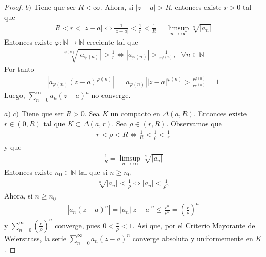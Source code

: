 \begin{proof}
    $b)$ Tiene que ser $R < \infty$. Ahora, si $|z-a| > R$, entonces existe $r > 0$ tal que
    \begin{align*}
        R < r < |z-a| \Longleftrightarrow \frac{1}{|z-a|} < \frac{1}{r} < \frac{1}{R} = \limsup_{n \to \infty}{\sqrt[n]{|a_n|}}
    \end{align*}
    Entonces existe $\varphi : \mathbb{N} \longrightarrow \mathbb{N}$ creciente tal que
    \begin{align*}
        \sqrt[\varphi(n)]{\left|a_{\varphi(n)}\right|} > \frac{1}{r} \Longleftrightarrow \left|a_{\varphi(n)}\right| > \frac{1}{r^{\varphi(n)}}, \ \ \ \forall n \in \mathbb{N}
    \end{align*}
    Por tanto
    \begin{align*}
        \left| a_{\varphi(n)}(z-a)^{\varphi(n)} \right| = \left| a_{\varphi(n)}\right|\left| z-a \right|^{\varphi(n)} > \frac{r^{\varphi(n)}}{r^{\varphi(n)}} = 1
    \end{align*}
    Luego, $\sum_{n=0}^{\infty}{a_n(z-a)^n}$ no converge.

    $a)$  $c)$ Tiene que ser $R > 0$. Sea $K$ un compacto en $\Delta(a,R)$. Entonces existe $r \in (0,R)$ tal que $K \subset \Delta(a,r)$. Sea $\rho \in (r,R)$. Observamos que
    \begin{align*}
        r < \rho < R \Longleftrightarrow \frac{1}{R} < \frac{1}{\rho} < \frac{1}{r}
    \end{align*}
    y que
    \begin{align*}
        \frac{1}{R} = \limsup_{n \to \infty}{\sqrt[n]{|a_n|}}
    \end{align*}
    Entonces existe $n_0 \in \mathbb{N}$ tal que si $n \ge n_0$
    \begin{align*}
        \sqrt[n]{|a_n|} < \frac{1}{\rho} \Longleftrightarrow |a_n| < \frac{1}{\rho^n}
    \end{align*}
    Ahora, si $n \ge n_0$
    \begin{align*}
        \left| a_n(z-a)^n \right| = \left| a_n \right| \left| z-a \right|^n \leq \frac{r^n}{\rho^n} = \left( \frac{r}{\rho} \right)^n
    \end{align*}
    y $\sum_{n=0}^{\infty}{\left( \frac{r}{\rho} \right)^n}$ converge, pues $0 <  \frac{r}{\rho} < 1$. Así que, por el Criterio Mayorante de Weierstrass, la serie  $\sum_{n=0}^{\infty}{a_n(z-a)^n}$ converge absoluta y uniformemente en $K$.
\end{proof}

